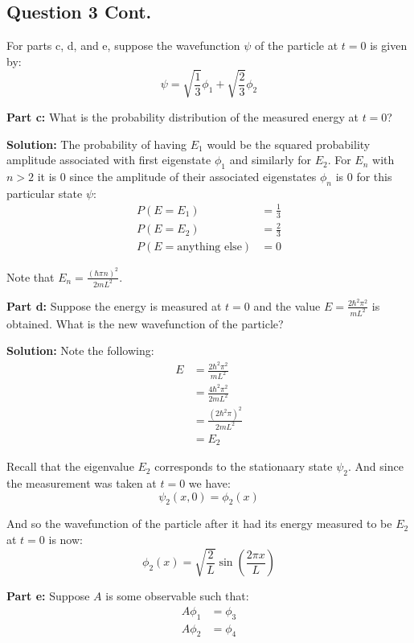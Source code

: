 \documentclass{article}
\begin{document}
\subsection*{Question 3 Cont.}
For parts c, d, and e, suppose the wavefunction $\psi$ of the particle at $t=0$ is given by:
$$\psi=\sqrt{\frac{1}{3}}\phi_1+\sqrt{\frac{2}{3}}\phi_2$$
\bigskip

\noindent\textbf{Part c:} What is the probability distribution of the measured energy at $t=0$?
\bigskip

\noindent\textbf{Solution:} The probability of having $E_1$ would be the squared probability amplitude associated with first eigenstate $\phi_1$ and similarly for $E_2$. For $E_n$ with $n>2$ it is 0 since the amplitude of their associated eigenstates $\phi_n$ is 0 for this particular state $\psi$:
\begin{align*}
    P(E=E_1)&=\frac{1}{3}\\
    P(E=E_2)&=\frac{2}{3}\\
    P(E=\text{anything else})&=0
\end{align*}

Note that $E_n=\frac{(\hbar\pi n)^2}{2mL^2}$.
\bigskip
\newpage

\noindent\textbf{Part d:} Suppose the energy is measured at $t=0$ and the value $E=\frac{2\hbar^2\pi^2}{mL^2}$ is obtained. What is the new wavefunction of the particle?
\bigskip

\noindent\textbf{Solution:} Note the following:
\begin{align*}
    E&=\frac{2\hbar^2\pi^2}{mL^2}\\
    &=\frac{4\hbar^2\pi^2}{2mL^2}\\
    &=\frac{(2\hbar^2\pi)^2}{2mL^2}\\
    &=E_2
\end{align*}

Recall that the eigenvalue $E_2$ corresponds to the stationaary state $\psi_2$. And since the measurement was taken at $t=0$ we have:
$$\psi_2(x,0)=\phi_2(x)$$

And so the wavefunction of the particle after it had its energy measured to be $E_2$ at $t=0$ is now:
$$\phi_2(x)=\sqrt{\frac{2}{L}}\sin\left(\frac{2\pi x}{L}\right)$$
\bigskip

\noindent\textbf{Part e:} Suppose $A$ is some observable such that:
\begin{align*}
    A\phi_1&=\phi_3\\
    A\phi_2&=\phi_4
\end{align*}
\end{document}
